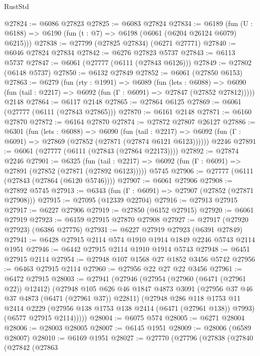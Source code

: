\begin{lexlean}{RustStd}
\begin{coremodule}
{\begin{coremodule}
{{{{{{{{{{{{{{{{{{{{{{{{{{@27824 := @6086 @27823
@27825 := @6083 @27824
@27834 := @6189
    (fun (U : @6188) => @6190 (fun (t : @7) => @6198 (@6061 (@6204 @26124 @6079) @6215)))
@27838 := @27799 (@27825 @27834) (@6271 @27771)
@27840 := @6046 @27824 @27834
@27842 := @6276 @27823 @5737
@27843 := @6113 @5737
@27847 := @6061 (@27777 (@6111 (@27843 @6126)))
@27849 := @27802 (@6148 @5737)
@27850 := @6132 @27849
@27852 := @6061 (@27850 @6153)
@27863 := @6279
    (fun (rty : @1991) =>
    @6089
      (fun (lets : @6088) =>
      @6090 (fun (tail : @2217) => @6092 (fun (Γ : @6091) => @27847 (@27852 @27812)))))
    @2148
@27864 := @6117 @2148
@27865 := @27864 @6125
@27869 := @6061 (@27777 (@6111 (@27843 @27865)))
@27870 := @6161 @2148
@27871 := @6160 @27870
@27872 := @6164 @27870
@27874 := @27872 @27807 @26127
@27886 := @6301
    (fun (lets : @6088) =>
    @6090
      (fun (tail : @2217) =>
      @6092 (fun (Γ : @6091) => @27869 (@27852 (@27871 (@27874 @6121 @6123))))))
    @2246
@27891 := @6061 (@27777 (@6111 (@27843 (@27864 @22173))))
@27892 := @27874 @2246
@27901 := @6325
    (fun (tail : @2217) => @6092 (fun (Γ : @6091) => @27891 (@27852 (@27871 (@27892 @6123)))))
    @5745
@27906 := @27777 (@6111 (@27843 (@27864 (@6120 @5746))))
@27907 := @6061 @27906
@27908 := @27892 @5745
@27913 := @6343 (fun (Γ : @6091) => @27907 (@27852 (@27871 @27908)))
@27915 := @27095 (@12339 @22704)
@27916 := @27913 @27915
@27917 := @6227 @27906
@27919 := @27850 (@6152 @27915)
@27920 := @6061 @27919
@27923 := @6159 @27915 @27870 @27908
@27927 := @27917 (@27920 @27923) (@6386 @27776)
@27931 := @6227 @27919 @27923 (@6391 @27849)
@27941 := @6428 @27915 @2114 @574 @1910 @1914 @1849 @2246 @5743 @2114 @1951
@27946 := @6442 @27915 @2114 @1910 @1914 @5743
@27948 := @6451 @27915 @2114
@27954 := @27948 @107 @1568 @27 @1852 @3456 @5742
@27956 := @6463 @27915 @2114
@27960 := @27956 @22 @27 @22 @3456
@27961 := @6472 @27915
@28003 := @27941
    (@27946
      (@27954
        (@27960 (@6471 (@27961 @22)) @12412)
        (@27948
          @105
          @626
          @46
          @1847
          @4873
          @3091
          (@27956 @37 @46 @37 @4873 (@6471 (@27961 @37)) @22811)
          (@27948
            @286
            @118
            @1753
            @11
            @2414
            @2229
            (@27956 @138 @1753 @138 @2414 (@6471 (@27961 @138)) @7993)
            (@6577 @27915 @2114)))))
@28004 := @6075 @574
@28005 := @6271 @28004
@28006 := @28003 @28005
@28007 := @6145 @1951
@28009 := @28006 (@6589 @28007)
@28010 := @6169 @1951
@28027 := @27770
    (@27796
      (@27838
        (@27840
          (@27842
            (@27863
}}}}}}}}}}}}}}}}}}}}}}}}}}
\end{coremodule}}
\end{coremodule}
\end{lexlean}
